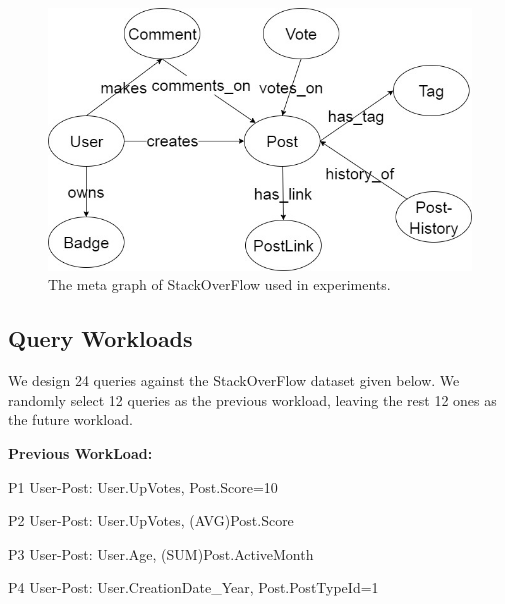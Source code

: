 \begin{figure}[H]
	\centering
	\includegraphics[scale=0.5]{pic/MetaExp.jpg}
	\caption{The meta graph of StackOverFlow used in experiments.}
	\label{fig:metaexp}
\end{figure}



\subsection{Query Workloads}
We design 24  queries against the StackOverFlow dataset given below. We randomly select 12 queries as the previous workload, leaving the rest 12 ones as the future workload.  %


\textbf{Previous WorkLoad:}

P1 \hspace{3mm} User-Post: User.UpVotes, Post.Score=10

P2 \hspace{3mm} User-Post: User.UpVotes, (AVG)Post.Score

P3 \hspace{3mm} User-Post: User.Age, (SUM)Post.ActiveMonth

P4 \hspace{3mm} User-Post: User.CreationDate\_Year, Post.PostTypeId=1

